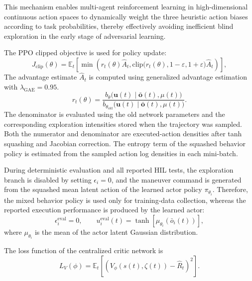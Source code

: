 \documentclass{cja}
\begin{document}
This mechanism enables multi-agent reinforcement learning in high-dimensional continuous action spaces to dynamically weight the three heuristic action biases according to task probabilities, thereby effectively avoiding inefficient blind exploration in the early stage of adversarial learning.

The PPO clipped objective is used for policy update:
\begin{equation}
J_{\mathrm{clip}}(\theta)
=
\mathbb E_t
\left[
\min
\left(
r_t(\theta)\hat A_t,
\mathrm{clip}\bigl(r_t(\theta),1-\varepsilon,1+\varepsilon\bigr)\hat A_t
\right)
\right],
\end{equation}
The advantage estimate $\hat A_t$ is computed using generalized advantage estimation with $\lambda_{\mathrm{GAE}}=0.95$.
\begin{equation}
r_t(\theta)
=
\frac{
b_{\theta}\bigl(\mathbf u(t)\mid \bar{\mathbf o}(t),\mu(t)\bigr)
}{
b_{\theta_{\mathrm{old}}}\bigl(\mathbf u(t)\mid \bar{\mathbf o}(t),\mu(t)\bigr)
}.
\end{equation}
The denominator is evaluated using the old network parameters and the corresponding exploration intensities stored when the trajectory was sampled. Both the numerator and denominator are executed-action densities after tanh squashing and Jacobian correction.
The entropy term of the squashed behavior policy is estimated from the sampled action log densities in each mini-batch.

During deterministic evaluation and all reported HIL tests, the exploration branch is disabled by setting $\epsilon_i=0$, and the maneuver command is generated from the squashed mean latent action of the learned actor policy $\pi_{\theta_i}$. Therefore, the mixed behavior policy is used only for training-data collection, whereas the reported execution performance is produced by the learned actor:
\begin{equation}
\epsilon_i^{\mathrm{eval}}=0,
\qquad
u_i^{\mathrm{eval}}(t)
=
\tanh
\left[
\mu_{\theta_i}
\left(
\bar o_i(t)
\right)
\right],
\end{equation}
where $\mu_{\theta_i}$ is the mean of the actor latent Gaussian distribution.

The loss function of the centralized critic network is
\begin{equation}
L_V(\phi)
=
\mathbb E_t
\left[
\left(
V_{\phi}(s(t),\zeta(t))
-
\hat R_t
\right)^2
\right].
\end{equation}
\end{document}
